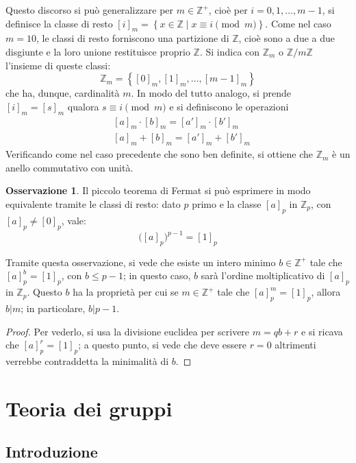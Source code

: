 \documentclass[11pt, a4paper]{scrartcl}
\theoremstyle{definition}
\numberwithin{esempio}{section}
\theoremstyle{definition}
\newtheorem{obs}{Osservazione}
\numberwithin{obs}{section}
\numberwithin{nota}{section}
\numberwithin{equation}{subsection}
\begin{document}
Questo discorso si pu\`o generalizzare per $m \in \mathbb{Z}^+$, cio\`e per $i = 0,1,\ldots,m-1$, si definisce la classe di resto $[i]_m = \left\{ x \in \mathbb{Z}  \mid x\equiv i \pmod{m}  \right\} $. 
Come nel caso $m=10$, le classi di resto forniscono una partizione di $\mathbb{Z}$, cio\`e sono a due a due disgiunte e la loro unione restituisce proprio $\mathbb{Z}$.
Si indica con $\mathbb{Z}_m$ o $\mathbb{Z} / m \mathbb{Z}$ l'insieme di queste classi:
\begin{equation}
	\mathbb{Z}_m = \left\{ [0]_m , [1]_m ,\ldots, [m-1]_{m}  \right\} 
\end{equation}
che ha, dunque, cardinalit\`a $m$.
In modo del tutto analogo, si prende $[i]_m = [s]_m$ qualora $s\equiv i \pmod{m} $ e si definiscono le operazioni
\[
	\begin{split}
		&[a]_{m} \cdot [b]_{m} = [a']_{m} \cdot [b']_{m} \\
		&[a]_{m} + [b]_{m} = [a']_{m} + [b']_{m} 
	\end{split}
\] 
Verificando come nel caso precedente che sono ben definite, si ottiene che $\mathbb{Z}_m$ \`e un anello commutativo con unit\`a.

\begin{obs}
	Il piccolo teorema di Fermat si pu\`o esprimere in modo equivalente tramite le classi di resto: dato $p$ primo e la classe $[a]_p$ in $\mathbb{Z}_p$, con $[a]_p \neq [0]_p$, vale:
	\begin{equation}
		\big([a]_p\big)^{p-1} = [1]_p
	\end{equation}
\end{obs}
Tramite questa osservazione, si vede che esiste un intero minimo $b \in \mathbb{Z}^+$ tale che $[a]^b_p = [1]_p$, con $b \le p-1$; in questo caso, $b$ sar\`a l'ordine moltiplicativo di $[a]_p$ in $\mathbb{Z}_p$.
Questo $b$ ha la propriet\`a per cui se $m \in \mathbb{Z}^+$ tale che $[a]_p^m = [1]_p$, allora $b | m$; in particolare, $b | p-1$.
\begin{proof}
	Per vederlo, si usa la divisione euclidea per scrivere $m=qb +r$ e si ricava che $[a]_p^r = [1]_p$; a questo punto, si vede che deve essere $r=0$ altrimenti verrebbe contraddetta la minimalit\`a di $b$.
\end{proof}
\newpage

\section{Teoria dei gruppi}
\subsection{Introduzione}
\end{document}

